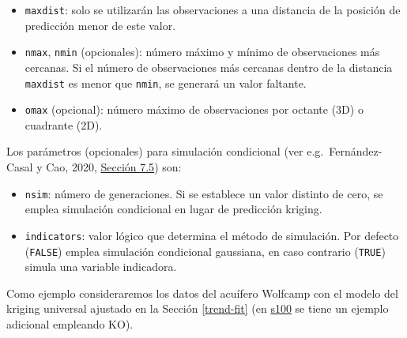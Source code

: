 \documentclass[
]{book}
\newenvironment{Shaded}{\begin{snugshade}}{\end{snugshade}}
\newcommand{\AttributeTok}[1]{\textcolor[rgb]{0.13,0.29,0.53}{#1}}
\newcommand{\CommentTok}[1]{\textcolor[rgb]{0.56,0.35,0.01}{\textit{#1}}}
\newcommand{\ConstantTok}[1]{\textcolor[rgb]{0.56,0.35,0.01}{#1}}
\newcommand{\DecValTok}[1]{\textcolor[rgb]{0.00,0.00,0.81}{#1}}
\newcommand{\FunctionTok}[1]{\textcolor[rgb]{0.13,0.29,0.53}{\textbf{#1}}}
\newcommand{\NormalTok}[1]{#1}
\newcommand{\OtherTok}[1]{\textcolor[rgb]{0.56,0.35,0.01}{#1}}
\newcommand{\SpecialCharTok}[1]{\textcolor[rgb]{0.81,0.36,0.00}{\textbf{#1}}}
\newcommand{\StringTok}[1]{\textcolor[rgb]{0.31,0.60,0.02}{#1}}
\providecommand{\tightlist}{%
  \setlength{\itemsep}{0pt}\setlength{\parskip}{0pt}}
\theoremstyle{break}
\theoremstyle{definition}
\theoremstyle{definition}
\theoremstyle{definition}
\theoremstyle{definition}
\theoremstyle{remark}
\begin{document}
\begin{itemize}
\tightlist
\item
  \texttt{maxdist}: solo se utilizarán las observaciones a una distancia de la posición de predicción menor de este valor.
\item
  \texttt{nmax}, \texttt{nmin} (opcionales): número máximo y mínimo de observaciones más cercanas. Si el número de observaciones más cercanas dentro de la distancia \texttt{maxdist} es menor que \texttt{nmin}, se generará un valor faltante.
\item
  \texttt{omax} (opcional): número máximo de observaciones por octante (3D) o cuadrante (2D).
\end{itemize}

Los parámetros (opcionales) para simulación condicional (ver e.g.~Fernández-Casal y Cao, 2020, \href{https://rubenfcasal.github.io/simbook/simulaci\%C3\%B3n-condicional-e-incondicional.html}{Sección 7.5}) son:

\begin{itemize}
\tightlist
\item
  \texttt{nsim}: número de generaciones. Si se establece un valor distinto de cero, se emplea simulación condicional en lugar de predicción kriging.
\item
  \texttt{indicators}: valor lógico que determina el método de simulación. Por defecto (\texttt{FALSE}) emplea simulación condicional gaussiana, en caso contrario (\texttt{TRUE}) simula una variable indicadora.
\end{itemize}

Como ejemplo consideraremos los datos del acuífero Wolfcamp con el modelo del kriging universal ajustado en la Sección \ref{trend-fit} (en \href{s100.html}{s100} se tiene un ejemplo adicional empleando KO).

\begin{Shaded}
\end{Shaded}
\end{document}

